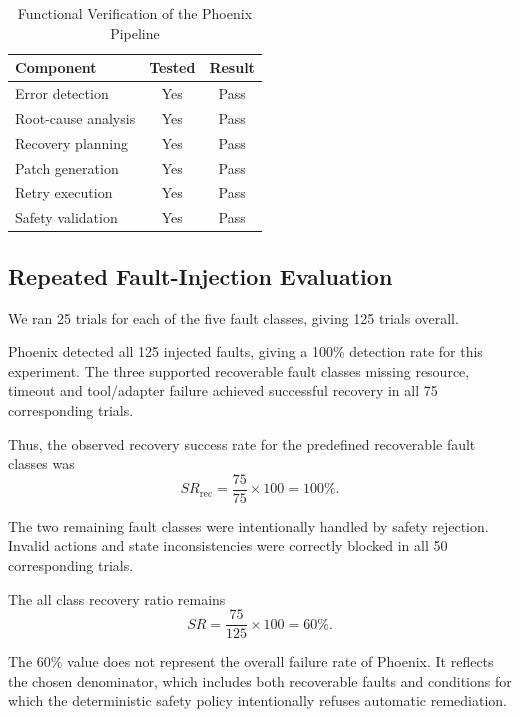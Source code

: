 \documentclass[conference]{IEEEtran}
\begin{document}
\begin{table}[htbp]
\caption{Functional Verification of the Phoenix Pipeline}
\label{tab:functional_verification}
\centering
\begin{tabular}{p{3.5cm} c c}
\toprule
\textbf{Component} & \textbf{Tested} & \textbf{Result} \\
\midrule
Error detection & Yes & Pass \\
Root-cause analysis & Yes & Pass \\
Recovery planning & Yes & Pass \\
Patch generation & Yes & Pass \\
Retry execution & Yes & Pass \\
Safety validation & Yes & Pass \\
\bottomrule
\end{tabular}
\end{table}

\subsection{Repeated Fault-Injection Evaluation}
We ran 25 trials for each of the five fault classes, giving 125 trials overall.

Phoenix detected all 125 injected faults, giving a 100\% detection rate for this experiment. The three supported recoverable fault classes missing resource, timeout and tool/adapter failure achieved successful recovery in all 75 corresponding trials.

Thus, the observed recovery success rate for the predefined recoverable fault classes was
\begin{equation}
SR_{\text{rec}} = \frac{75}{75} \times 100 = 100\%.
\end{equation}

The two remaining fault classes were intentionally handled by safety rejection. Invalid actions and state inconsistencies were correctly blocked in all 50 corresponding trials.

The all class recovery ratio remains
\begin{equation}
SR = \frac{75}{125} \times 100 = 60\%.
\end{equation}

The 60\% value does not represent the overall failure rate of Phoenix. It reflects the chosen denominator, which includes both recoverable faults and conditions for which the deterministic safety policy intentionally refuses automatic remediation.
\end{document}
